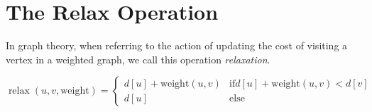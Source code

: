 \section{The Relax Operation}

In graph theory, when referring to the action of updating the cost of visiting a vertex in a weighted graph, we call this operation 
\emph{relaxation}. 

\[
    \operatorname{relax}(u,v, \text{weight}) = 
    \begin{cases}
        d[u] + \text{weight}(u,v) &\text{if} d[u] + \text{weight}(u,v) < d[v] \\ 
        d[u] & \text{else}
    \end{cases}
\]




